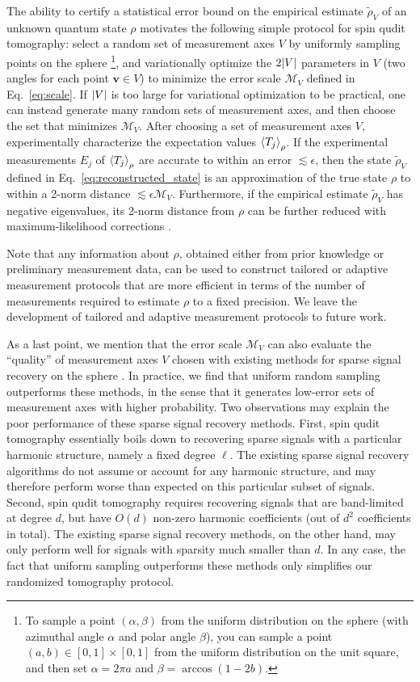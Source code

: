 \documentclass[notitlepage,twocolumn]{revtex4-2}
\newcommand{\p}[1]{\left(#1\right)} %
\newcommand{\bk}{\Braket} %
\renewcommand{\v}{\bm} %
\newcommand{\1}{\mathds{1}}
\newcommand{\M}{\mathcal{M}}
\begin{document}
The ability to certify a statistical error bound on the empirical estimate $\tilde\rho_V$ of an unknown quantum state $\rho$ motivates the following simple protocol for spin qudit tomography: select a random set of measurement axes $V$ by uniformly sampling points on the sphere \footnote{To sample a point $\p{\alpha,\beta}$ from the uniform distribution on the sphere (with azimuthal angle $\alpha$ and polar angle $\beta$), you can sample a point $\p{a,b}\in[0,1]\times[0,1]$ from the uniform distribution on the unit square, and then set $\alpha=2\pi a$ and $\beta=\arccos\p{1-2b}$.}, and variationally optimize the $2\abs{V}$ parameters in $V$ (two angles for each point $\v v\in V$) to minimize the error scale $\M_V$ defined in Eq.~\eqref{eq:scale}.
If $\abs{V}$ is too large for variational optimization to be practical, one can instead generate many random sets of measurement axes, and then choose the set that minimizes $\M_V$.
After choosing a set of measurement axes $V$, experimentally characterize the expectation values $\bk{T_j}_\rho$.
If the experimental measurements $E_j$ of $\bk{T_j}_\rho$ are accurate to within an error $\lesssim\epsilon$, then the state $\tilde\rho_V$ defined in Eq.~\eqref{eq:reconstructed_state} is an approximation of the true state $\rho$ to within a 2-norm distance $\lesssim\epsilon\M_V$.
Furthermore, if the empirical estimate $\tilde\rho_V$ has negative eigenvalues, its 2-norm distance from $\rho$ can be further reduced with maximum-likelihood corrections \cite{smolin2012efficient}.

Note that any information about $\rho$, obtained either from prior knowledge or preliminary measurement data, can be used to construct tailored or adaptive measurement protocols \cite{pereira2018adaptive} that are more efficient in terms of the number of measurements required to estimate $\rho$ to a fixed precision.
We leave the development of tailored and adaptive measurement protocols to future work.

As a last point, we mention that the error scale $\M_V$ can also evaluate the ``quality'' of measurement axes $V$ chosen with existing methods for sparse signal recovery on the sphere \cite{rauhut2011sparse, alem2012sparse}.
In practice, we find that uniform random sampling outperforms these methods, in the sense that it generates low-error sets of measurement axes with higher probability.
Two observations may explain the poor performance of these sparse signal recovery methods.
First, spin qudit tomography essentially boils down to recovering sparse signals with a particular harmonic structure, namely a fixed degree $\ell$.
The existing sparse signal recovery algorithms do not assume or account for any harmonic structure, and may therefore perform worse than expected on this particular subset of signals.
Second, spin qudit tomography requires recovering signals that are band-limited at degree $d$, but have $O(d)$ non-zero harmonic coefficients (out of $d^2$ coefficients in total).
The existing sparse signal recovery methods, on the other hand, may only perform well for signals with sparsity much smaller than $d$.
In any case, the fact that uniform sampling outperforms these methods only simplifies our randomized tomography protocol.
\end{document}

